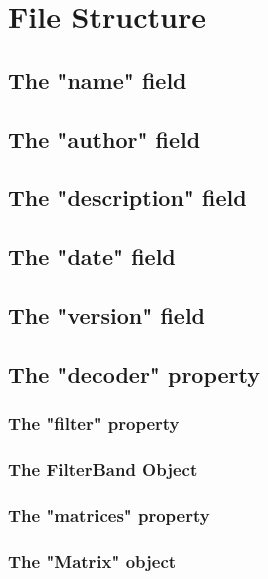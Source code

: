 \section[Structure]{File Structure}

\subsection{The "name" field}

\subsection{The "author" field}

\subsection{The "description" field}

\subsection{The "date" field}

\subsection{The "version" field}

\subsection{The "decoder" property}

\subsubsection{The "filter" property}
    \subsubsection{The FilterBand Object}

\subsubsection{The "matrices" property}
    \subsubsection{The "Matrix" object}

